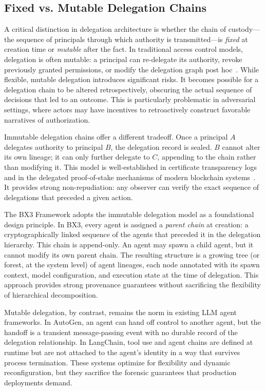 \subsection{Fixed vs. Mutable Delegation Chains}

A critical distinction in delegation architecture is whether the chain of custody---the sequence of principals through which authority is transmitted---is \emph{fixed} at creation time or \emph{mutable} after the fact. In traditional access control models, delegation is often mutable: a principal can re-delegate its authority, revoke previously granted permissions, or modify the delegation graph post hoc~\cite{ellison1999 SPKI,later2002pem}. While flexible, mutable delegation introduces significant risks. It becomes possible for a delegation chain to be altered retrospectively, obscuring the actual sequence of decisions that led to an outcome. This is particularly problematic in adversarial settings, where actors may have incentives to retroactively construct favorable narratives of authorization.

Immutable delegation chains offer a different tradeoff. Once a principal $A$ delegates authority to principal $B$, the delegation record is sealed. $B$ cannot alter its own lineage; it can only further delegate to $C$, appending to the chain rather than modifying it. This model is well-established in certificate transparency logs~\cite{laurie2014certificate} and in the delegated proof-of-stake mechanisms of modern blockchain systems~\cite{king2012ppcoin}. It provides strong non-repudiation: any observer can verify the exact sequence of delegations that preceded a given action.

The BX3 Framework adopts the immutable delegation model as a foundational design principle. In BX3, every agent is assigned a \emph{parent chain} at creation: a cryptographically linked sequence of the agents that preceded it in the delegation hierarchy. This chain is append-only. An agent may spawn a child agent, but it cannot modify its own parent chain. The resulting structure is a growing tree (or forest, at the system level) of agent lineages, each node annotated with its spawn context, model configuration, and execution state at the time of delegation. This approach provides strong provenance guarantees without sacrificing the flexibility of hierarchical decomposition.

Mutable delegation, by contrast, remains the norm in existing LLM agent frameworks. In AutoGen, an agent can hand off control to another agent, but the handoff is a transient message-passing event with no durable record of the delegation relationship. In LangChain, tool use and agent chains are defined at runtime but are not attached to the agent's identity in a way that survives process termination. These systems optimize for flexibility and dynamic reconfiguration, but they sacrifice the forensic guarantees that production deployments demand.

